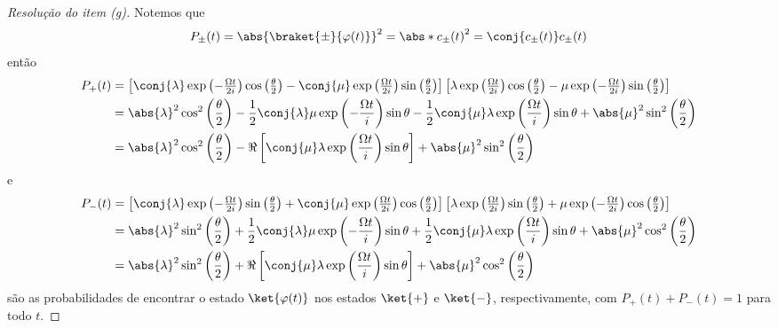 \begin{proof}[Resolução do item (g)]
    Notemos que
    \begin{equation*}
        P_\pm(t) = \abs{\braket{\pm}{\varphi(t)}}^2 = \abs*{c_\pm(t)}^2 = \conj{c_\pm(t)}c_{\pm}(t)
    \end{equation*}
    então
    \begin{align*}
        P_+(t) &= {\textstyle\left[\conj{\lambda}\exp\left(-\frac{\Omega t}{2i}\right)\cos\left(\frac\theta2\right) - \conj{\mu}\exp\left(\frac{\Omega t}{2i}\right)\sin\left(\frac\theta2\right)\right]\left[\lambda\exp\left(\frac{\Omega t}{2i}\right)\cos\left(\frac\theta2\right) - \mu\exp\left(-\frac{\Omega t}{2i}\right)\sin\left(\frac\theta2\right)\right]}\\
               &= \abs{\lambda}^2 \cos^2\left(\frac\theta2\right) - \frac12 \conj{\lambda}\mu \exp\left(-\frac{\Omega t}{i}\right) \sin\theta - \frac12 \conj{\mu}\lambda \exp\left(\frac{\Omega t}{i}\right) \sin\theta + \abs{\mu}^2 \sin^2\left(\frac\theta2\right)\\
               &= \abs{\lambda}^2\cos^2\left(\frac\theta2\right) - \Re\left[\conj{\mu} \lambda \exp\left(\frac{\Omega t}{i}\right) \sin\theta\right] + \abs{\mu}^2 \sin^2\left(\frac\theta2\right)
    \end{align*}
    e
    \begin{align*}
        P_-(t) &= {\textstyle\left[\conj{\lambda}\exp\left(-\frac{\Omega t}{2i}\right)\sin\left(\frac\theta2\right) + \conj{\mu}\exp\left(\frac{\Omega t}{2i}\right)\cos\left(\frac\theta2\right)\right]\left[\lambda\exp\left(\frac{\Omega t}{2i}\right)\sin\left(\frac\theta2\right) + \mu\exp\left(-\frac{\Omega t}{2i}\right)\cos\left(\frac\theta2\right)\right]}\\
               &= \abs{\lambda}^2\sin^2\left(\frac\theta2\right) + \frac12\conj{\lambda}\mu\exp\left(-\frac{\Omega t}{i}\right)\sin\theta + \frac12 \conj{\mu} \lambda \exp\left(\frac{\Omega t}{i}\right)\sin\theta + \abs{\mu}^2\cos^2\left(\frac\theta2\right)\\
               &=\abs{\lambda}^2\sin^2\left(\frac{\theta}{2}\right) + \Re\left[\conj{\mu}\lambda\exp\left(\frac{\Omega t}{i}\right)\sin\theta\right] + \abs{\mu}^2\cos^2\left(\frac\theta2\right)
    \end{align*}
    são as probabilidades de encontrar o estado \(\ket{\varphi(t)}\) nos estados \(\ket{+}\) e \(\ket{-}\), respectivamente, com \(P_+(t) + P_-(t) = 1\) para todo \(t\).
\end{proof}
